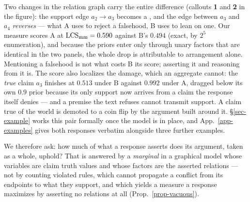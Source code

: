 Two changes in the relation graph carry the entire difference (callouts \textbf{1} and \textbf{2} in the figure): the support
edge $a_2\!\to\!a_3$ becomes a \con{}, and the edge between $a_3$ and $a_4$ \emph{reverses} --- what A uses to
reject a falsehood, B uses to lean on one. Our measure scores A at $\mathrm{LCS}_{\mathrm{mm}}=0.590$ against B's $0.494$
(exact, by $2^5$ enumeration), and because the priors enter only through unary factors that are identical in
the two panels, the whole drop is attributable to arrangement alone. Mentioning a falsehood is not what costs B
its score; asserting it and reasoning from it is. The score also localizes the damage, which an aggregate
cannot: the \emph{true} claim $a_3$ finishes at $0.513$ under B against $0.992$ under A, dragged below its own
$0.9$ prior because its only support now arrives from a claim the response itself denies --- and a premise the
text refuses cannot transmit support. A claim true of the world is demoted to a coin flip by the argument built
around it. \S\ref{sec-example} works this pair formally once the model is in place, and
App.~\ref{app-examples} gives both responses verbatim alongside three further examples.

We therefore ask: how much of what a response asserts does its argument, taken as a whole, uphold? That is
answered by a \emph{marginal} in a graphical model whose variables are claim truth values and whose factors
are the asserted relations --- not by counting violated rules, which cannot propagate a conflict from its
endpoints to what they support, and which yields a measure a response maximizes by asserting no relations at
all (Prop.~\ref{prop-vacuous}).

